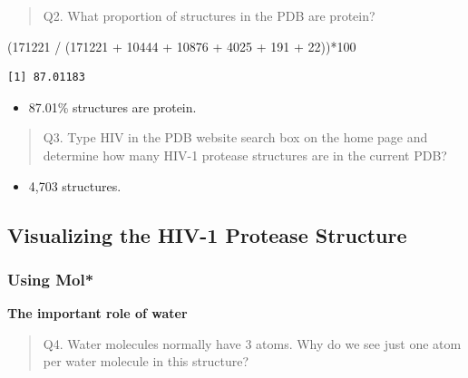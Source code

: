 \documentclass[
  letterpaper,
  DIV=11,
  numbers=noendperiod]{scrartcl}
\newenvironment{Shaded}{\begin{snugshade}}{\end{snugshade}}
\newcommand{\DecValTok}[1]{\textcolor[rgb]{0.68,0.00,0.00}{#1}}
\newcommand{\NormalTok}[1]{\textcolor[rgb]{0.00,0.23,0.31}{#1}}
\newcommand{\SpecialCharTok}[1]{\textcolor[rgb]{0.37,0.37,0.37}{#1}}
\providecommand{\tightlist}{%
  \setlength{\itemsep}{0pt}\setlength{\parskip}{0pt}}\usepackage{longtable,booktabs,array}
\begin{document}
\begin{quote}
Q2. What proportion of structures in the PDB are protein?
\end{quote}

\begin{Shaded}
\begin{Highlighting}[]
\NormalTok{(}\DecValTok{171221} \SpecialCharTok{/}\NormalTok{ (}\DecValTok{171221} \SpecialCharTok{+} \DecValTok{10444} \SpecialCharTok{+} \DecValTok{10876} \SpecialCharTok{+} \DecValTok{4025} \SpecialCharTok{+} \DecValTok{191} \SpecialCharTok{+} \DecValTok{22}\NormalTok{))}\SpecialCharTok{*}\DecValTok{100}
\end{Highlighting}
\end{Shaded}

\begin{verbatim}
[1] 87.01183
\end{verbatim}

\begin{itemize}
\tightlist
\item
  87.01\% structures are protein.
\end{itemize}

\begin{quote}
Q3. Type HIV in the PDB website search box on the home page and
determine how many HIV-1 protease structures are in the current PDB?
\end{quote}

\begin{itemize}
\tightlist
\item
  4,703 structures.
\end{itemize}

\hypertarget{visualizing-the-hiv-1-protease-structure}{%
\subsection{Visualizing the HIV-1 Protease
Structure}\label{visualizing-the-hiv-1-protease-structure}}

\hypertarget{using-mol}{%
\subsubsection{Using Mol*}\label{using-mol}}

\textbf{The important role of water}

\begin{quote}
Q4. Water molecules normally have 3 atoms. Why do we see just one atom
per water molecule in this structure?
\end{quote}
\end{document}
